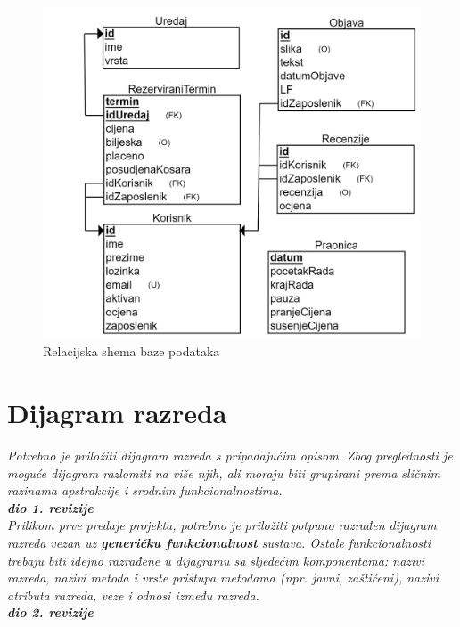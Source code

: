 				\begin{figure}[H]
					\includegraphics[scale=0.2]{slike/BAZA.PNG} %
					\centering
					\caption{Relacijska shema baze podataka}
					\label{fig:promjene}
				\end{figure}
			\eject
			
			
		\section{Dijagram razreda}
		
			\textit{Potrebno je priložiti dijagram razreda s pripadajućim opisom. Zbog preglednosti je moguće dijagram razlomiti na više njih, ali moraju biti grupirani prema sličnim razinama apstrakcije i srodnim funkcionalnostima.}\\
			
			\textbf{\textit{dio 1. revizije}}\\
			
			\textit{Prilikom prve predaje projekta, potrebno je priložiti potpuno razrađen dijagram razreda vezan uz \textbf{generičku funkcionalnost} sustava. Ostale funkcionalnosti trebaju biti idejno razrađene u dijagramu sa sljedećim komponentama: nazivi razreda, nazivi metoda i vrste pristupa metodama (npr. javni, zaštićeni), nazivi atributa razreda, veze i odnosi između razreda.}\\
			
			\textbf{\textit{dio 2. revizije}}\\			
			
